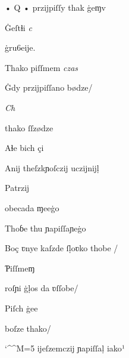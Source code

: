{%

\splitverse

  • Q • przĳpiſſy thak ġeɱv

\indentVerse Ġeſtɬi \textit{c}  


\newverseline {} ġru6eĳe.

\indentVerse Thako piſſmem \textit{czas} 


\newverseline {} Ġdy  przĳpiſſano bødze/

\indentVerse \textit{Ch}  

\newpage


\splitverse

 thako ſſzødze

\indentVerse Aɬe bich çi 


\splitverse


\indentVerse Anĳ theſzkɲoſczĳ uczĳnĳḷ

\indentVerse Patrzĳ 


\splitverse

obecada ɱeeġo

\indentVerse Thoɓe thu ɲapiſſaɲeġo 


\splitverse

Boç ʋnye kaſzde ſḷoʋko thobe /

\indentVerse Ƥiſſmeɱ 


\splitverse

roſɲi ġḷos da ʋſſobe/

\indentVerse  Piſch ġee 


\splitverse

 boſze thako/

\catcode `\^^M=5
\obeylines
\indentVerse ĳeſzemczĳ ɲapiſſaḷ iako¹

}
